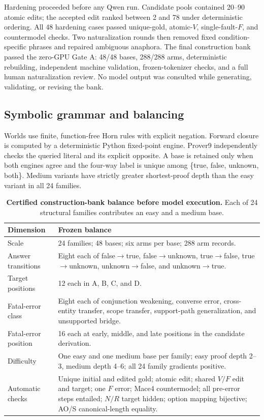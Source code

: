 \documentclass[letterpaper]{article}
\begin{document}
Hardening proceeded before any Qwen run.  Candidate pools contained 20--90 atomic edits; the accepted edit ranked between 2 and 78 under deterministic ordering.  All 48 hardening cases passed unique-gold, atomic-$V$, single-fault-$F$, and countermodel checks.  Two naturalization rounds then removed fixed condition-specific phrases and repaired ambiguous anaphora.  The final construction bank passed the zero-GPU Gate A: 48/48 bases, 288/288 arms, deterministic rebuilding, independent machine validation, frozen-tokenizer checks, and a full human naturalization review.  No model output was consulted while generating, validating, or revising the bank.

\subsection{Symbolic grammar and balancing}

Worlds use finite, function-free Horn rules with explicit negation.  Forward closure is computed by a deterministic Python fixed-point engine.  Prover9 independently checks the queried literal and its explicit opposite.  A base is retained only when both engines agree and the four-way label is unique among \{true, false, unknown, both\}.  Medium variants have strictly greater shortest-proof depth than the easy variant in all 24 families.

\begin{table}[t]
\centering
\small
\begin{tabular}{L{3.0cm}L{10.7cm}}
\toprule
Dimension & Frozen balance \\
\midrule
Scale & 24 families; 48 bases; six arms per base; 288 arm records. \\
Answer transitions & Eight each of false$\rightarrow$true, false$\rightarrow$unknown, true$\rightarrow$false, true$\rightarrow$unknown, unknown$\rightarrow$false, and unknown$\rightarrow$true. \\
Target positions & 12 each in A, B, C, and D. \\
Fatal-error class & Eight each of conjunction weakening, converse error, cross-entity transfer, scope transfer, support-path generalization, and unsupported bridge. \\
Fatal-error position & 16 each at early, middle, and late positions in the candidate derivation. \\
Difficulty & One easy and one medium base per family; easy proof depth 2--3, medium depth 4--6; all 24 family gradients positive. \\
Automatic checks & Unique initial and edited gold; atomic edit; shared $V/F$ edit and target; one $F$ error; Mace4 countermodel; all pre-error steps entailed; $N/R$ target hidden; option mapping bijective; AO/S canonical-length equality. \\
\bottomrule
\end{tabular}
\caption{\textbf{Certified construction-bank balance before model execution.} Each of 24 structural families contributes an easy and a medium base.}
\label{tab:supp-data-balance}
\end{table}
\end{document}
